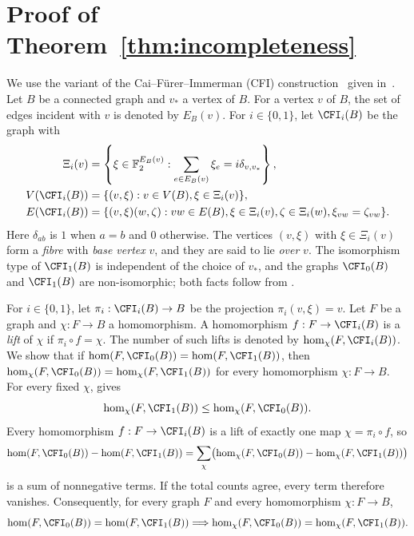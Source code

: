 \section{Proof of Theorem~\ref{thm:incompleteness}}
\label{sec:incompleteness}

We use the variant of the Cai--F\"urer--Immerman (CFI)
construction~\cite{CaiFurerImmerman1992} given
in~\cite[Definition~3.1]{Roberson2026}.
Let $B$ be a connected graph and $v_*$ a vertex of $B$.
For a vertex $v$ of $B$, the set of edges incident with $v$ is denoted by
$E_B(v)$.
For $i\in\{0,1\}$, let $\CFI_i(B)$ be the graph with
\begin{equation}\label{eq:ss-cfi-definition}
 \begin{aligned}
 \Xi_i(v)&=\left\{\xi\in\mathbb F_2^{E_B(v)}:
   \sum_{e\in E_B(v)}\xi_e=i\delta_{v,v_*}\right\},\\
 V(\CFI_i(B))&=\{(v,\xi):v\in V(B),\xi\in \Xi_i(v)\},\\
 E(\CFI_i(B))&=\{(v,\xi)(w,\zeta):vw\in E(B),\xi\in \Xi_i(v),\zeta\in \Xi_i(w),\xi_{vw}=\zeta_{vw}\}.
 \end{aligned}
\end{equation}
Here $\delta_{ab}$ is $1$ when $a=b$ and $0$ otherwise.
The vertices $(v,\xi)$ with $\xi\in \Xi_i(v)$ form a \emph{fibre} with
\emph{base vertex} $v$, and they are said to lie \emph{over} $v$.
The isomorphism type of $\CFI_1(B)$ is independent of the choice of
$v_*$, and the graphs $\CFI_0(B)$ and $\CFI_1(B)$ are non-isomorphic;
both facts follow from \cite[Lemma~5]{Neuen2024}.

For $i\in\{0,1\}$, let $\pi_i:\CFI_i(B)\to B$ be the projection
$\pi_i(v,\xi)=v$.
Let $F$ be a graph and $\chi:F\to B$ a homomorphism.
A homomorphism $f:F\to\CFI_i(B)$ is a \emph{lift} of $\chi$ if
$\pi_i\circ f=\chi$.
The number of such lifts is denoted by $\hom_\chi(F,\CFI_i(B))$.
We show that if $\hom(F,\CFI_0(B))=\hom(F,\CFI_1(B))$, then
$\hom_\chi(F,\CFI_0(B))=\hom_\chi(F,\CFI_1(B))$ for every homomorphism
$\chi:F\to B$.
For every fixed $\chi$, \cite[Theorem~3.6]{Roberson2026} gives
\begin{equation}\label{eq:ss-coloured-monotonicity}
  \hom_\chi(F,\CFI_1(B))\leq\hom_\chi(F,\CFI_0(B)).
\end{equation}
Every homomorphism $f:F\to\CFI_i(B)$ is a lift of exactly one map
$\chi=\pi_i\circ f$, so
\begin{equation}\label{eq:ss-lift-differences}
 \hom(F,\CFI_0(B))-\hom(F,\CFI_1(B))
 =\sum_\chi\bigl(\hom_\chi(F,\CFI_0(B))-\hom_\chi(F,\CFI_1(B))\bigr)
\end{equation}
is a sum of nonnegative terms. If the total counts agree, every term
therefore vanishes.
Consequently, for every graph $F$ and every homomorphism
$\chi:F\to B$,
\begin{equation}\label{eq:ss-lift-equality}
 \hom(F,\CFI_0(B))=\hom(F,\CFI_1(B))
 \Longrightarrow
 \hom_\chi(F,\CFI_0(B))=\hom_\chi(F,\CFI_1(B)).
\end{equation}

